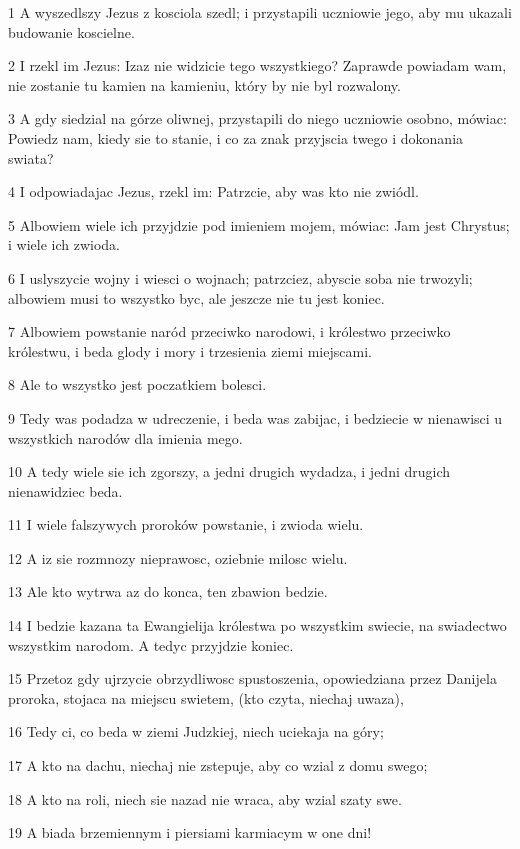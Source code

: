\par 1 A wyszedlszy Jezus z kosciola szedl; i przystapili uczniowie jego, aby mu ukazali budowanie koscielne.
\par 2 I rzekl im Jezus: Izaz nie widzicie tego wszystkiego? Zaprawde powiadam wam, nie zostanie tu kamien na kamieniu, który by nie byl rozwalony.
\par 3 A gdy siedzial na górze oliwnej, przystapili do niego uczniowie osobno, mówiac: Powiedz nam, kiedy sie to stanie, i co za znak przyjscia twego i dokonania swiata?
\par 4 I odpowiadajac Jezus, rzekl im: Patrzcie, aby was kto nie zwiódl.
\par 5 Albowiem wiele ich przyjdzie pod imieniem mojem, mówiac: Jam jest Chrystus; i wiele ich zwioda.
\par 6 I uslyszycie wojny i wiesci o wojnach; patrzciez, abyscie soba nie trwozyli; albowiem musi to wszystko byc, ale jeszcze nie tu jest koniec.
\par 7 Albowiem powstanie naród przeciwko narodowi, i królestwo przeciwko królestwu, i beda glody i mory i trzesienia ziemi miejscami.
\par 8 Ale to wszystko jest poczatkiem bolesci.
\par 9 Tedy was podadza w udreczenie, i beda was zabijac, i bedziecie w nienawisci u wszystkich narodów dla imienia mego.
\par 10 A tedy wiele sie ich zgorszy, a jedni drugich wydadza, i jedni drugich nienawidziec beda.
\par 11 I wiele falszywych proroków powstanie, i zwioda wielu.
\par 12 A iz sie rozmnozy nieprawosc, oziebnie milosc wielu.
\par 13 Ale kto wytrwa az do konca, ten zbawion bedzie.
\par 14 I bedzie kazana ta Ewangielija królestwa po wszystkim swiecie, na swiadectwo wszystkim narodom. A tedyc przyjdzie koniec.
\par 15 Przetoz gdy ujrzycie obrzydliwosc spustoszenia, opowiedziana przez Danijela proroka, stojaca na miejscu swietem, (kto czyta, niechaj uwaza),
\par 16 Tedy ci, co beda w ziemi Judzkiej, niech uciekaja na góry;
\par 17 A kto na dachu, niechaj nie zstepuje, aby co wzial z domu swego;
\par 18 A kto na roli, niech sie nazad nie wraca, aby wzial szaty swe.
\par 19 A biada brzemiennym i piersiami karmiacym w one dni!
